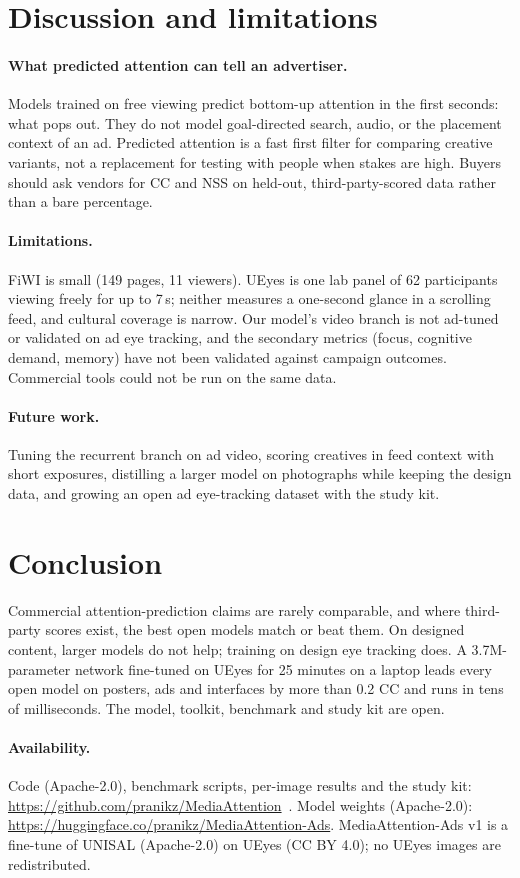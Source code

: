 \documentclass[11pt]{article}
\begin{document}
\section{Discussion and limitations}
\paragraph{What predicted attention can tell an advertiser.} Models trained on free viewing predict bottom-up attention
in the first seconds: what pops out. They do not model goal-directed search, audio, or the placement context of an ad.
Predicted attention is a fast first filter for comparing creative variants, not a replacement for testing with people
when stakes are high. Buyers should ask vendors for CC and NSS on held-out, third-party-scored data rather than a bare
percentage.

\paragraph{Limitations.} FiWI is small (149 pages, 11 viewers). UEyes is one lab panel of 62 participants viewing freely
for up to 7\,s; neither measures a one-second glance in a scrolling feed, and cultural coverage is narrow. Our model's
video branch is not ad-tuned or validated on ad eye tracking, and the secondary metrics (focus, cognitive demand,
memory) have not been validated against campaign outcomes. Commercial tools could not be run on the same data.

\paragraph{Future work.} Tuning the recurrent branch on ad video, scoring creatives in feed context with short
exposures, distilling a larger model on photographs while keeping the design data, and growing an open ad
eye-tracking dataset with the study kit.

\section{Conclusion}
Commercial attention-prediction claims are rarely comparable, and where third-party scores exist, the best open models
match or beat them. On designed content, larger models do not help; training on design eye tracking does. A
3.7M-parameter network fine-tuned on UEyes for 25 minutes on a laptop leads every open model on posters, ads and
interfaces by more than 0.2 CC and runs in tens of milliseconds. The model, toolkit, benchmark and study kit are open.

\paragraph{Availability.} Code (Apache-2.0), benchmark scripts, per-image results and the study kit:
\url{https://github.com/pranikz/MediaAttention}~\cite{mahapatra2026mediaattention}. Model weights (Apache-2.0):
\url{https://huggingface.co/pranikz/MediaAttention-Ads}. MediaAttention-Ads v1 is a fine-tune of UNISAL (Apache-2.0)
on UEyes (CC BY 4.0); no UEyes images are redistributed.



\end{document}
